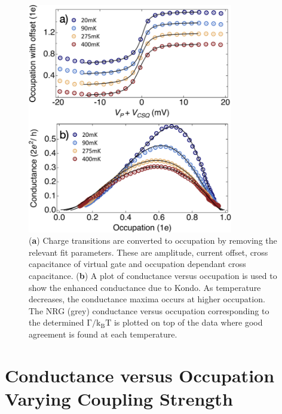 \begin{figure}[!bht]
 \begin{center}
 \includegraphics[width=0.8\textwidth]{figures/ch3/crop_FiguresMaster.014.png}
 \caption[Method to determine occupation and plot conductance vs. occupation]{\label{fig:ch3/cond_vs_occ_gf} 
 (\textbf{a}) Charge transitions are converted to occupation by removing the relevant fit parameters. These are amplitude, current offset, cross capacitance of virtual gate and occupation dependant cross capacitance. (\textbf{b}) A plot of conductance versus occupation is used to show the enhanced conductance due to Kondo. As temperature decreases, the conductance maxima occurs at higher occupation. The NRG (grey) conductance versus occupation corresponding to the determined $\mathrm{\Gamma/k_BT}$ is plotted on top of the data where good agreement is found at each temperature.}
 \end{center}
\end{figure}


\section{Conductance versus Occupation Varying Coupling Strength}



